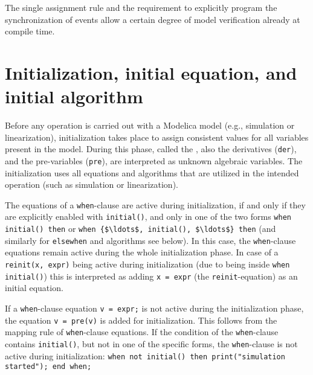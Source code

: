 \begin{nonnormative}
The single assignment rule and the requirement to explicitly program the synchronization of events allow a certain degree of model verification already at compile time.
\end{nonnormative}


\section{Initialization, initial equation, and initial algorithm}\label{initialization-initial-equation-and-initial-algorithm}

Before any operation is carried out with a Modelica model (e.g., simulation or linearization), initialization takes place to assign consistent values for all variables present in the model.
During this phase, called the , also the derivatives (\lstinline!der!), and the pre-variables (\lstinline!pre!), are interpreted as unknown algebraic variables.
The initialization uses all equations and algorithms that are utilized in the intended operation (such as simulation or linearization).

The equations of a \lstinline!when!-clause are active during initialization, if and only if they are explicitly enabled with \lstinline!initial()!, and only in one of the two forms \lstinline!when initial() then! or \lstinline!when {$\ldots$, initial(), $\ldots$} then! (and similarly for \lstinline!elsewhen! and algorithms see below).
In this case, the \lstinline!when!-clause equations remain active during the whole initialization phase.
In case of a \lstinline!reinit(x, expr)! being active during initialization (due to being inside \lstinline!when initial()!) this is interpreted as adding \lstinline!x = expr! (the \lstinline!reinit!-equation) as an initial equation.

\begin{nonnormative}
If a \lstinline!when!-clause equation \lstinline!v = expr;! is not active during the initialization phase, the equation \lstinline!v = pre(v)! is added for initialization.
This follows from the mapping rule of \lstinline!when!-clause equations.
If the condition of the \lstinline!when!-clause contains \lstinline!initial()!,
but not in one of the specific forms, the \lstinline!when!-clause is not active during initialization: \lstinline!when not initial() then print("simulation started"); end when;!
\end{nonnormative}

